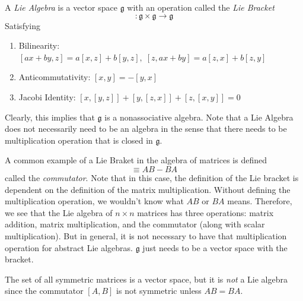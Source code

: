 \documentclass{article}
\begin{document}
    \begin{definition}
      A \textit{Lie Algebra} is a vector space $\mathfrak{g}$ with an operation called the \textit{Lie Bracket} 
      \begin{equation}
        [\cdot, \cdot]: \mathfrak{g} \times \mathfrak{g} \longrightarrow \mathfrak{g}
      \end{equation}
      Satisfying
      \begin{enumerate}
        \item Bilinearity: $[ax + by, z] = a[x,z] + b[y,z], \; [z, ax + by] = a[z, x] + b[z,y]$
        \item Anticommutativity: $[x,y] = -[y,x]$
        \item Jacobi Identity: $[x,[y,z]] + [y,[z,x]] + [z,[x,y]] = 0$
      \end{enumerate}
      Clearly, this implies that $\mathfrak{g}$ is a nonassociative algebra. Note that a Lie Algebra does not necessarily need to be an algebra in the sense that there needs to be multiplication operation that is closed in $\mathfrak{g}$. 
    \end{definition}

    \begin{example}
      A common example of a Lie Braket in the algebra of matrices is defined
      \begin{equation}
        [A, B] \equiv AB - BA
      \end{equation}
      called the \textit{commutator}. Note that in this case, the definition of the Lie bracket is dependent on the definition of the matrix multiplication. Without defining the multiplication operation, we wouldn't know what $AB$ or $BA$ means. Therefore, we see that the Lie algebra of $n \times n$ matrices has three operations: matrix addition, matrix multiplication, and the commutator (along with scalar multiplication). But in general, it is not necessary to have that multiplication operation for abstract Lie algebras. $\mathfrak{g}$ just needs to be a vector space with the bracket.  
    \end{example}

    \begin{example}
      The set of all symmetric matrices is a vector space, but it is \textit{not} a Lie algebra since the commutator $[A,B]$ is not symmetric unless $A B = B A$. 
    \end{example}
\end{document}
